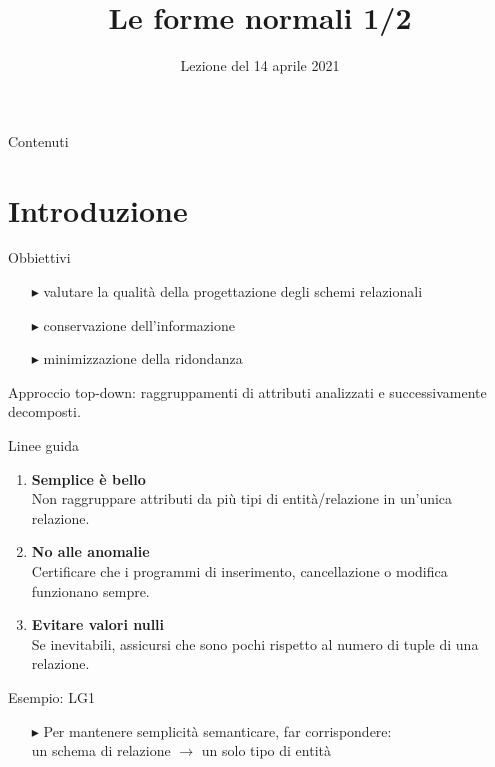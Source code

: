 \documentclass{beamer}
\title{Le forme normali 1/2}
\institute{Università di Pisa}
\date{Lezione del 14 aprile 2021}
\begin{document}
\frame{\titlepage}
\begin{frame}{Contenuti}
\begin{multicols}{2}
  \tableofcontents
\end{multicols}
\end{frame}


\section{Introduzione}

\begin{frame}{Obbiettivi}
    
    \begin{itemize}
        \item[$\blacktriangleright$] valutare la qualità della progettazione degli schemi relazionali 
        \item[$\blacktriangleright$]  conservazione dell’informazione
        \item[$\blacktriangleright$]  minimizzazione della ridondanza
    \end{itemize}
    \vfill
    Approccio top-down: raggruppamenti di attributi analizzati e successivamente decomposti.
    
\end{frame}

\begin{frame}{Linee guida}

    \begin{enumerate}
        \item \textbf{Semplice è bello} \\ Non raggruppare attributi da più tipi di entità/relazione in un’unica relazione. 
        \item \textbf{No alle anomalie} \\  Certificare che i programmi di inserimento, cancellazione o modifica funzionano sempre.
        \item \textbf{Evitare valori nulli} \\  Se inevitabili, assicursi che sono pochi rispetto al numero di tuple di una relazione.
    \end{enumerate}
    
\end{frame}


\begin{frame}{Esempio: LG1}

    \begin{itemize}
    
        \item[$\blacktriangleright$] Per mantenere semplicità semanticare, far corrispondere:\\
        un schema di relazione $\rightarrow$ un solo tipo di entità
    \end{itemize}


\end{frame}
\end{document}
